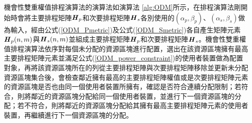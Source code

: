 機會性雙重權值排程演算法的演算法如演算法 \ref{alg:ODM}所示，在排程演算法剛開始時會將主要排程矩陣$\textbf{\textit{H}}_p$和次要排程矩陣$\textbf{\textit{H}}_s$各別使用的$(\alpha_p,\beta_p)$、$(\alpha_s,\beta_s)$做為輸入，經由公式(\ref{ODM_Pmetric})及公式(\ref{ODM_Smetric})各自產生矩陣元素$\textbf{\textit{H}}_p(n,m)$與$\textbf{\textit{H}}_s(n,m)$並組成主要排程矩陣$\textbf{\textit{H}}_p$和次要排程矩陣$\textbf{\textit{H}}_s$。機會性雙重權值排程演算法依序對每個未分配的資源區塊進行配置，選出在該資源區塊擁有最高主要排程矩陣元素並滿足公式(\ref{ODM_power_constraint})的使用者裝置做為配置對象，再將該資源區塊所在的列從主要排程矩陣與次要排程矩陣移除並更新未分配資源區塊集合後，會檢查鄰近擁有最高的主要排程矩陣權值或是次要排程矩陣元素的資源區塊是否也由同一個使用者裝置所擁有，確認是否符合連續分配限制；若符合，則將鄰近的資源區塊分配給同一個使用者裝置，並進行下一個資源區塊的分配；若不符合，則將鄰近的資源區塊分配給其擁有最高主要排程矩陣元素的使用者裝置，再繼續進行下一個資源區塊的分配。
